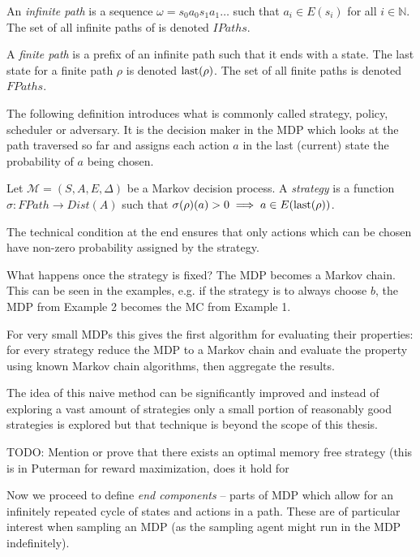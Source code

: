 \begin{definition}[Path]
    An {\em infinite path} is
    a sequence $\omega = s_0 a_0 s_1 a_1
    \ldots$ such that $a_i \in E(s_i)$ for all $i \in \mathbb{N}$.
    The set of all infinite paths of is denoted $IPaths$.

    A {\em finite path} is a prefix of an infinite path such that it
    ends with a state. The last state for a finite path $\rho$ is
    denoted $\operatorname{last}(\rho)$. The set of all finite paths is denoted
    $FPaths$.
\end{definition}

The following definition introduces what is commonly called strategy,
policy, scheduler or adversary. It is the decision maker in the MDP which
looks at the path traversed so far and assigns each action $a$
in the last (current) state the probability of $a$ being chosen.


\begin{definition}[Strategy]
    Let $\mathcal{M} = (S,A,E,\Delta)$ be a Markov decision process.
    A {\em strategy} is a function
    $\sigma : FPath \to Dist(A)$
    such that
    $\sigma(\rho)(a) > 0 \implies a \in E(\operatorname{last}(\rho))$.
\end{definition}

The technical condition at the end ensures that only actions which can
be chosen have non-zero probability assigned by the strategy.

What happens once the strategy is fixed? The MDP becomes a Markov chain.
This can be seen in the examples, e.g. if the strategy is to always
choose $b$, the MDP from Example 2 becomes the MC from Example 1.

For very small MDPs this gives the first algorithm for evaluating their
properties: for every strategy reduce the MDP to a Markov chain and evaluate the
property using known Markov chain algorithms, then aggregate the
results.

The idea of this naive method can be significantly improved and instead
of exploring a vast amount of strategies only a small portion of
reasonably good strategies is explored \parencite{smc} but that
technique is beyond the scope of this thesis.

TODO: Mention or prove that there exists an optimal memory free strategy
(this is in Puterman for reward maximization, does it hold for


Now we proceed to define {\em end components} -- parts of MDP which
allow for an infinitely repeated cycle of states and actions in a path.
These are of particular interest when sampling an MDP (as the sampling
agent might run in the MDP indefinitely).

